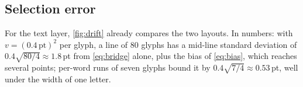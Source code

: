 \subsection{Selection error}

For the text layer, \cref{fig:drift} already compares the two layouts. In
numbers: with $v = (0.4\,\mathrm{pt})^2$ per glyph, a line of $80$ glyphs has a
mid-line standard deviation of $0.4\sqrt{80/4} \approx 1.8$\,pt from
\cref{eq:bridge} alone, plus the bias of \cref{eq:bias}, which reaches several
points; per-word runs of seven glyphs bound it by $0.4\sqrt{7/4} \approx
0.53$\,pt, well under the width of one letter.
